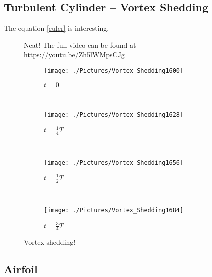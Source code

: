 \documentclass[10pt, titlepage]{article}
\begin{document}

\subsection{Turbulent Cylinder -- Vortex Shedding}

The equation \eqref{euler} is interesting.

\begin{figure}[htb]
\centering
{}
\caption[Vortex Shedding Animation]{Neat! The full video can be found at \url{https://youtu.be/Zh5lWMpsCJg}}
\label{vortexanimation}
\end{figure}

\lipsum[1-2]

\begin{figure}
\begin{subfigure}{\linewidth}
  \centering
  \texttt{[image: ./Pictures/Vortex\_Shedding1600]}
  \caption{$t = 0$}
\end{subfigure} \\
\begin{subfigure}{\textwidth}
  \centering
  \texttt{[image: ./Pictures/Vortex\_Shedding1628]}
  \caption{$t = \frac{1}{4}T$}
\end{subfigure} \\
\begin{subfigure}{\linewidth}
  \centering
  \texttt{[image: ./Pictures/Vortex\_Shedding1656]}
  \caption{$t = \frac{1}{2}T$}
\end{subfigure} \\
\begin{subfigure}{\textwidth}
  \centering
  \texttt{[image: ./Pictures/Vortex\_Shedding1684]}
  \caption{$t = \frac{3}{4}T$}
\end{subfigure}
\caption[Vortex Shedding at $\frac{1}{4}T$ increments]{Vortex shedding!}
\label{fig:vortexshedding}
\end{figure}

\subsection{Airfoil}
\lipsum[4-7]
\end{document}
